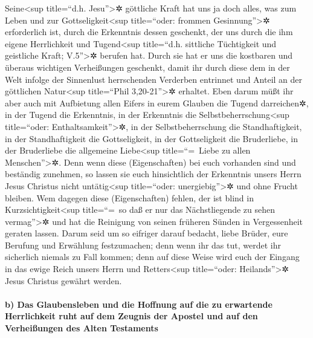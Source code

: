  Seine\textless sup title=``d.h. Jesu''\textgreater✲
göttliche Kraft hat uns ja doch alles, was zum Leben und zur
Gottseligkeit\textless sup title=``oder: frommen
Gesinnung''\textgreater✲ erforderlich ist, durch die Erkenntnis dessen
geschenkt, der uns durch die ihm eigene Herrlichkeit und
Tugend\textless sup title=``d.h. sittliche Tüchtigkeit und geistliche
Kraft; V.5''\textgreater✲ berufen hat.  Durch sie hat er
uns die kostbaren und überaus wichtigen Verheißungen geschenkt, damit
ihr durch diese dem in der Welt infolge der Sinnenlust herrschenden
Verderben entrinnet und Anteil an der göttlichen Natur\textless sup
title=``Phil 3,20-21''\textgreater✲ erhaltet.  Eben darum
müßt ihr aber auch mit Aufbietung allen Eifers in eurem Glauben die
Tugend darreichen✲, in der Tugend die Erkenntnis,  in der
Erkenntnis die Selbstbeherrschung\textless sup title=``oder:
Enthaltsamkeit''\textgreater✲, in der Selbstbeherrschung die
Standhaftigkeit, in der Standhaftigkeit die Gottseligkeit,
 in der Gottseligkeit die Bruderliebe, in der Bruderliebe
die allgemeine Liebe\textless sup title=``=~Liebe zu allen
Menschen''\textgreater✲.  Denn wenn diese (Eigenschaften)
bei euch vorhanden sind und beständig zunehmen, so lassen sie euch
hinsichtlich der Erkenntnis unsers Herrn Jesus Christus nicht
untätig\textless sup title=``oder: unergiebig''\textgreater✲ und ohne
Frucht bleiben.  Wem dagegen diese (Eigenschaften) fehlen,
der ist blind in Kurzsichtigkeit\textless sup title=``=~so daß er nur
das Nächstliegende zu sehen vermag''\textgreater✲ und hat die Reinigung
von seinen früheren Sünden in Vergessenheit geraten lassen.
 Darum seid um so eifriger darauf bedacht, liebe Brüder,
eure Berufung und Erwählung festzumachen; denn wenn ihr das tut, werdet
ihr sicherlich niemals zu Fall kommen;  denn auf diese
Weise wird euch der Eingang in das ewige Reich unsers Herrn und
Retters\textless sup title=``oder: Heilands''\textgreater✲ Jesus
Christus gewährt werden.

\hypertarget{b-das-glaubensleben-und-die-hoffnung-auf-die-zu-erwartende-herrlichkeit-ruht-auf-dem-zeugnis-der-apostel-und-auf-den-verheiuxdfungen-des-alten-testaments}{%
\paragraph{b) Das Glaubensleben und die Hoffnung auf die zu erwartende
Herrlichkeit ruht auf dem Zeugnis der Apostel und auf den Verheißungen
des Alten
Testaments}\label{b-das-glaubensleben-und-die-hoffnung-auf-die-zu-erwartende-herrlichkeit-ruht-auf-dem-zeugnis-der-apostel-und-auf-den-verheiuxdfungen-des-alten-testaments}}


